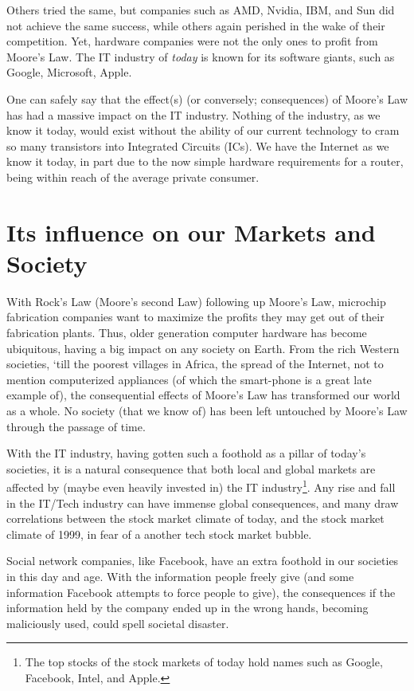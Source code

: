 \documentclass[a4paper,12pt]{article}
\begin{document}
Others tried the same, but companies such as AMD, Nvidia, IBM, and Sun did not achieve the same success, while others again perished in the wake of their competition.
Yet, hardware companies were not the only ones to profit from Moore's Law.
The IT industry of \emph{today} is known for its software giants, such as Google, Microsoft, Apple.

One can safely say that the effect(s) (or conversely; consequences) of Moore's Law has had a massive impact on the IT industry.
Nothing of the industry, as we know it today, would exist without the ability of our current technology to cram so many transistors into Integrated Circuits (ICs).
We have the Internet as we know it today, in part due to the now simple hardware requirements for a router, being within reach of the average private consumer.

\section*{Its influence on our Markets and Society}

With Rock's Law (Moore's second Law) following up Moore's Law, microchip fabrication companies want to maximize the profits they may get out of their fabrication plants.
Thus, older generation computer hardware has become ubiquitous, having a big impact on any society on Earth.
From the rich Western societies, `till the poorest villages in Africa, the spread of the Internet, not to mention computerized appliances (of which the smart-phone is a great late example of), the consequential effects of Moore's Law has transformed our world as a whole.
No society (that we know of) has been left untouched by Moore's Law through the passage of time.

With the IT industry, having gotten such a foothold as a pillar of today's societies, it is a natural consequence that both local and global markets are affected by (maybe even heavily invested in) the IT industry\footnote{The top stocks of the stock markets of today hold names such as Google, Facebook, Intel, and Apple\cite{ITstockMarkets}.}.
Any rise and fall in the IT/Tech industry can have immense global consequences, and many draw correlations between the stock market climate of today, and the stock market climate of 1999, in fear of a another tech stock market bubble\cite{TechBubbleBursting}.

Social network companies, like Facebook, have an extra foothold\cite{FacebookInternetAfrica} in our societies in this day and age.
With the information people freely give (and some information Facebook attempts to force people to give\cite{FacebookRealNamePolicyConsequences}), the consequences if the information held by the company ended up in the wrong hands, becoming maliciously used, could spell societal disaster.
\end{document}
